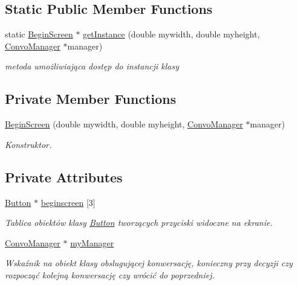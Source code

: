 \subsection*{Static Public Member Functions}
\begin{DoxyCompactItemize}
\item 
\mbox{\label{class_begin_screen_ad02e3ad29e7f81d1922e6d62b7377282}} 
static \mbox{\hyperlink{class_begin_screen}{Begin\+Screen}} $\ast$ \mbox{\hyperlink{class_begin_screen_ad02e3ad29e7f81d1922e6d62b7377282}{get\+Instance}} (double mywidth, double myheight, \mbox{\hyperlink{class_convo_manager}{Convo\+Manager}} $\ast$manager)
\begin{DoxyCompactList}\small\item\em metoda umożliwiająca dostęp do instancji klasy \end{DoxyCompactList}\end{DoxyCompactItemize}
\subsection*{Private Member Functions}
\begin{DoxyCompactItemize}
\item 
\mbox{\hyperlink{class_begin_screen_aa98715c8198b99da006c49b314a278d9}{Begin\+Screen}} (double mywidth, double myheight, \mbox{\hyperlink{class_convo_manager}{Convo\+Manager}} $\ast$manager)
\begin{DoxyCompactList}\small\item\em Konstruktor. \end{DoxyCompactList}\end{DoxyCompactItemize}
\subsection*{Private Attributes}
\begin{DoxyCompactItemize}
\item 
\mbox{\label{class_begin_screen_a7b3dca4f818afd0aebcaf0c156052cf1}} 
\mbox{\hyperlink{class_button}{Button}} $\ast$ \mbox{\hyperlink{class_begin_screen_a7b3dca4f818afd0aebcaf0c156052cf1}{beginscreen}} \mbox{[}3\mbox{]}
\begin{DoxyCompactList}\small\item\em Tablica obiektów klasy \mbox{\hyperlink{class_button}{Button}} tworzących przyciski widoczne na ekranie. \end{DoxyCompactList}\item 
\mbox{\label{class_begin_screen_aed874b0a42d5b8d0f7753e8b92cd16d3}} 
\mbox{\hyperlink{class_convo_manager}{Convo\+Manager}} $\ast$ \mbox{\hyperlink{class_begin_screen_aed874b0a42d5b8d0f7753e8b92cd16d3}{my\+Manager}}
\begin{DoxyCompactList}\small\item\em Wskaźnik na obiekt klasy obslugującej konwersację, konieczny przy decyzji czy rozpocząć kolejną konwersację czy wrócić do poprzedniej. \end{DoxyCompactList}\end{DoxyCompactItemize}
